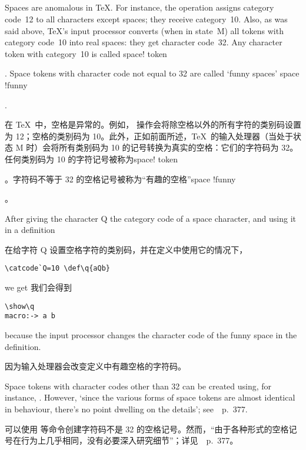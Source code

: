 \subsection{}

Spaces are anomalous in \TeX.
For instance, the  operation 
assigns category code~12 to all
characters except spaces; they receive category~10.
Also, as was said above, \TeX's input processor converts (when in
state~{\italic M}) all tokens with category code~10 into real spaces:
they get character code~32.
Any character token with category~10 is called
\term space! token\par.
Space tokens with character
code not equal to 32 are called `funny spaces'
\term space !funny\par.

在 \TeX\ 中，空格是异常的。例如， 操作会将除空格以外的所有字符的类别码设置为 12；空格的类别码为 10。此外，正如前面所述，\TeX\ 的输入处理器（当处于状态 {\italic M} 时）会将所有类别码为 10 的记号转换为真实的空格：它们的字符码为 32。任何类别码为 10 的字符记号被称为\term space! token\par。字符码不等于 32 的空格记号被称为“有趣的空格”\term space !funny\par。

\begin{example} After giving the character \n Q 
the category code of a space character, 
and using it in a definition

在给字符 \n Q 设置空格字符的类别码，并在定义中使用它的情况下，
\begin{verbatim}
\catcode`Q=10 \def\q{aQb}
\end{verbatim}
we get 我们会得到
\begin{verbatim}
\show\q
macro:-> a b
\end{verbatim}
because the input processor
changes the character code of the funny space
in the definition.

因为输入处理器会改变定义中有趣空格的字符码。
\end{example}

Space tokens with character codes other than 32 can be
created using, for instance, .
However, `since the various forms of
space tokens are almost identical in behaviour, there's no
point dwelling on the details'; see~\cite{Knuth:TeXbook}~p.~377.

可以使用  等命令创建字符码不是 32 的空格记号。然而，“由于各种形式的空格记号在行为上几乎相同，没有必要深入研究细节”；详见~\cite{Knuth:TeXbook}~p.~377。


